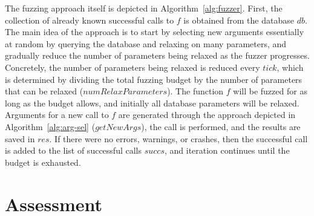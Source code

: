 \documentclass[sigplan,anonymous,review]{acmart}
\begin{document}
The fuzzing approach itself is depicted in Algorithm~\ref{alg:fuzzer}.
First, the collection of already known successful calls to $f$ is obtained from the database $db$.
The main idea of the approach is to start by selecting new arguments essentially at random by querying the database and relaxing on many parameters, and gradually reduce the number of parameters being relaxed as the fuzzer progresses.
Concretely, the number of parameters being relaxed is reduced every $tick$, which is determined by dividing the total fuzzing budget by the number of parameters that can be relaxed ($numRelaxParameters$).
The function $f$ will be fuzzed for as long as the budget allows, and initially all database parameters will be relaxed.
Arguments for a new call to $f$ are generated through the approach depicted in Algorithm~\ref{alg:arg-sel} ($getNewArgs$), the call is performed, and the results are saved in $res$.
If there were no errors, warnings, or crashes, then the successful call is added to the list of successful calls $succs$, and iteration continues until the budget is exhausted.



%
%

\section{Assessment}
\label{sec:assessment}
\end{document}
